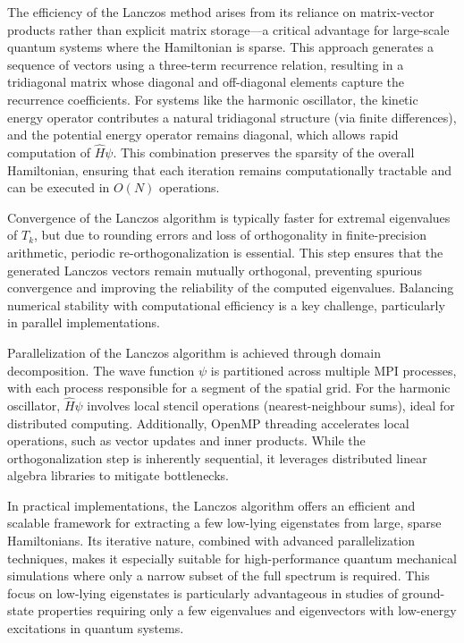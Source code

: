 \documentclass[12pt,a4paper]{report}
\begin{document}
The efficiency of the Lanczos method arises from its reliance on matrix-vector products rather than explicit matrix storage—a critical advantage for large-scale quantum systems where the Hamiltonian is sparse. This approach generates a sequence of vectors using a three-term recurrence relation, resulting in a tridiagonal matrix whose diagonal and off-diagonal elements capture the recurrence coefficients. For systems like the harmonic oscillator, the kinetic energy operator contributes a natural tridiagonal structure (via finite differences), and the potential energy operator remains diagonal, which allows rapid computation of $\hat{H}\psi$. This combination preserves the sparsity of the overall Hamiltonian, ensuring that each iteration remains computationally tractable and can be executed in $O(N)$ operations.

Convergence of the Lanczos algorithm is typically faster for extremal eigenvalues of $T_k$, but due to rounding errors and loss of orthogonality in finite-precision arithmetic, periodic re-orthogonalization is essential. This step ensures that the generated Lanczos vectors remain mutually orthogonal, preventing spurious convergence and improving the reliability of the computed eigenvalues. Balancing numerical stability with computational efficiency is a key challenge, particularly in parallel implementations.

Parallelization of the Lanczos algorithm is achieved through domain decomposition. The wave function $\psi$ is partitioned across multiple MPI processes, with each process responsible for a segment of the spatial grid. For the harmonic oscillator, $\hat{H}\psi$ involves local stencil operations (nearest-neighbour sums), ideal for distributed computing. Additionally, OpenMP threading accelerates local operations, such as vector updates and inner products. While the orthogonalization step is inherently sequential, it leverages distributed linear algebra libraries to mitigate bottlenecks.

In practical implementations, the Lanczos algorithm \cite{Lanczos:1950:IMS} offers an efficient and scalable framework for extracting a few low-lying eigenstates from large, sparse Hamiltonians. Its iterative nature, combined with advanced parallelization techniques, makes it especially suitable for high-performance quantum mechanical simulations where only a narrow subset of the full spectrum is required. This focus on low-lying eigenstates is particularly advantageous in studies of ground-state properties requiring only a few eigenvalues and eigenvectors with low-energy excitations in quantum systems.
\end{document}

